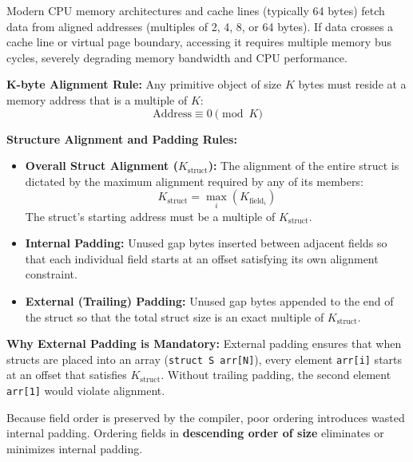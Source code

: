 \begin{remark}
    Modern CPU memory architectures and cache lines (typically 64 bytes) fetch data from aligned addresses (multiples of 2, 4, 8, or 64 bytes). If data crosses a cache line or virtual page boundary, accessing it requires multiple memory bus cycles, severely degrading memory bandwidth and CPU performance.
\end{remark}

\begin{theorem}
    \textbf{K-byte Alignment Rule:} Any primitive object of size $K$ bytes must reside at a memory address that is a multiple of $K$:
    $$\text{Address} \equiv 0 \pmod K$$
\end{theorem}

\begin{theorem}
    \textbf{Structure Alignment and Padding Rules:}
    \begin{itemize}
        \item \textbf{Overall Struct Alignment ($K_{\text{struct}}$):} The alignment of the entire struct is dictated by the maximum alignment required by any of its members:
        $$K_{\text{struct}} = \max_i(K_{\text{field}_i})$$
        The struct's starting address must be a multiple of $K_{\text{struct}}$.
        \item \textbf{Internal Padding:} Unused gap bytes inserted between adjacent fields so that each individual field starts at an offset satisfying its own alignment constraint.
        \item \textbf{External (Trailing) Padding:} Unused gap bytes appended to the end of the struct so that the total struct size is an exact multiple of $K_{\text{struct}}$.
    \end{itemize}
\end{theorem}

\begin{important}
    \textbf{Why External Padding is Mandatory:} External padding ensures that when structs are placed into an array (\texttt{struct S arr[N]}), every element \texttt{arr[i]} starts at an offset that satisfies $K_{\text{struct}}$. Without trailing padding, the second element \texttt{arr[1]} would violate alignment.
\end{important}

\begin{remark}
    Because field order is preserved by the compiler, poor ordering introduces wasted internal padding. Ordering fields in \textbf{descending order of size} eliminates or minimizes internal padding.
\end{remark}

